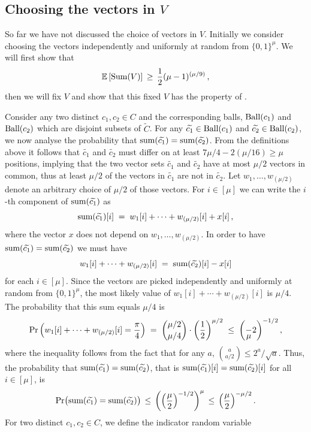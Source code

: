 \documentclass{toc}
\newcommand{\Prob}{\ensuremath{\textup{Pr}}}
\newcommand{\ball}[1]{\ensuremath{\textup{Ball}(#1)}}
\newcommand{\Vsum}{\ensuremath{\textup{Sum}}}
\newcommand{\vsum}{\ensuremath{\textup{sum}}}
\newcommand{\Cbig}{\ensuremath{\widetilde{C}}}
\newcommand{\cbigI}{\ensuremath{\widetilde{c_1}}}
\newcommand{\cbigII}{\ensuremath{\widetilde{c_2}}}
\newcommand{\ELL}{\ensuremath{\mu}}
\newcommand{\expect}[1]{\mathbb{E}\left[{#1}\right]}
\begin{document}
\subsection{Choosing the vectors in \texorpdfstring{$V$}{V}}

So far we have not discussed the choice of vectors in $V$. 
Initially we consider choosing the vectors  independently and uniformly at random from $\{0,1\}^\ELL$.
We will first show that
\[
\expect{\Vsum(V)}\,\geq\, \frac12 (\ELL-1)^{(\ELL/9)}\,,
\]
then we will fix $V$ and show that this fixed $V$ has the property of .

Consider any two distinct  $c_1,c_2\in C$  and the corresponding balls, $\ball{c_1}$ and $\ball{c_2}$  which are disjoint subsets of $\Cbig$. For any $\cbigI\in\ball{c_1}$ and $\cbigII\in\ball{c_2}$, we now analyse the probability that
$\vsum(\cbigI)=\vsum(\cbigII)$. {}From the definitions above it follows that $\cbigI$ and $\cbigII$ must differ
on at least $7\ELL/4-2(\ELL/16)\geq \ELL$ positions, implying that the two vector sets $\cbigI$ and
$\cbigII$ have at most $\ELL/2$ vectors in common, thus at least $\ELL/2$ of the vectors in $\cbigI$ are not in $\cbigII$.
Let $w_1,\dots,w_{(\ELL/2)}$ denote an arbitrary choice of $\mu/2$ of those vectors.
For $i\in[\mu]$ we can write the $i$-th component of $\vsum(\cbigI)$ as
\[
\vsum(\cbigI)[i] \;=\; w_1[i]+\cdots +w_{(\ELL/2)}[i] + x[i]\,,
\]
where the vector $x$ does not depend on $w_1,\dots,w_{(\ELL/2)}$.
In order to have $\vsum(\cbigI)=\vsum(\cbigII)$ we must have
\[
w_1[i]+\cdots +w_{(\ELL/2)}[i] \;=\; \vsum(\cbigII)[i] - x[i]
\]
for each $i\in [\ELL]$.
Since the vectors are picked independently and uniformly at random from $\{0,1\}^\mu$,
the most likely value of $w_1[i]+\cdots +w_{(\ELL/2)}[i]$ is $\ELL/4$.
The probability that this sum equals $\mu/4$ is
\[
\Prob\left(w_1[i]+\cdots +w_{(\ELL/2)}[i] = \frac\pi 4\right)
\;=\;
\binom{\ELL/2}{\ELL/4 }\cdot \left(\frac12\right)^{\ELL/2}
\;\leq\;
\left(\frac \ELL 2\right)^{-1/2},
\]
where the inequality follows from the fact that for any $a$, $\binom a {a/2}\leq 2^a/\sqrt{a}$.
Thus, the probability that $\vsum(\cbigI)=\vsum(\cbigII)$, that is
$\vsum(\cbigI)[i]=\vsum(\cbigII)[i]$ for all $i\in [\mu]$, is
%
\begin{equation}
\label{eq:sum-equal}
\Prob\big(\vsum(\cbigI)=\vsum(\cbigII)\big)
\, \leq \,
\left(\left(\frac{\ELL}{2}\right)^{-1/2}\right)^\mu
\, \leq \,
\left(\frac{\ELL}{2}\right)^{-\ELL/2}.
\end{equation}
%
For two distinct $c_1,c_2\in C$, we define the indicator random variable
\end{document}
